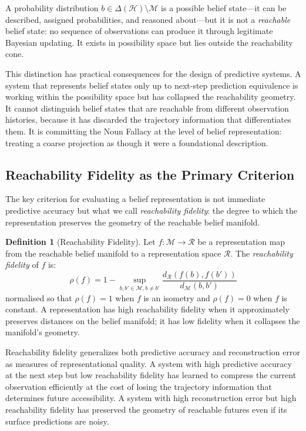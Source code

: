 \documentclass[12pt, a4paper]{article}
\theoremstyle{plain}
\theoremstyle{definition}
\newtheorem{definition}[theorem]{Definition}
\theoremstyle{remark}
\begin{document}
A probability distribution $b \in \Delta(\mathcal{H}) \setminus \mathcal{M}$
is a possible belief state---it can be described, assigned probabilities,
and reasoned about---but it is not a \emph{reachable} belief state: no
sequence of observations can produce it through legitimate Bayesian updating.
It exists in possibility space but lies outside the reachability cone.

This distinction has practical consequences for the design of predictive
systems. A system that represents belief states only up to next-step
prediction equivalence is working within the possibility space but has
collapsed the reachability geometry. It cannot distinguish belief states
that are reachable from different observation histories, because it has
discarded the trajectory information that differentiates them. It is
committing the Noun Fallacy at the level of belief representation: treating
a coarse projection as though it were a foundational description.

\subsection{Reachability Fidelity as the Primary Criterion}

The key criterion for evaluating a belief representation is not immediate
predictive accuracy but what we call \emph{reachability fidelity}: the
degree to which the representation preserves the geometry of the reachable
belief manifold.

\begin{definition}[Reachability Fidelity]
Let $f: \mathcal{M} \to \mathcal{R}$ be a representation map from the
reachable belief manifold to a representation space $\mathcal{R}$. The
\emph{reachability fidelity} of $f$ is:
$$\rho(f) = 1 - \sup_{b, b' \in \mathcal{M}, b \neq b'} \frac{d_{\mathcal{R}}(f(b), f(b'))}{d_{\mathcal{M}}(b, b')}$$
normalised so that $\rho(f) = 1$ when $f$ is an isometry and $\rho(f) = 0$
when $f$ is constant. A representation has high reachability fidelity when
it approximately preserves distances on the belief manifold; it has low
fidelity when it collapses the manifold's geometry.
\end{definition}

Reachability fidelity generalizes both predictive accuracy and reconstruction
error as measures of representational quality. A system with high predictive
accuracy at the next step but low reachability fidelity has learned to
compress the current observation efficiently at the cost of losing the
trajectory information that determines future accessibility. A system with
high reconstruction error but high reachability fidelity has preserved the
geometry of reachable futures even if its surface predictions are noisy.
\end{document}
